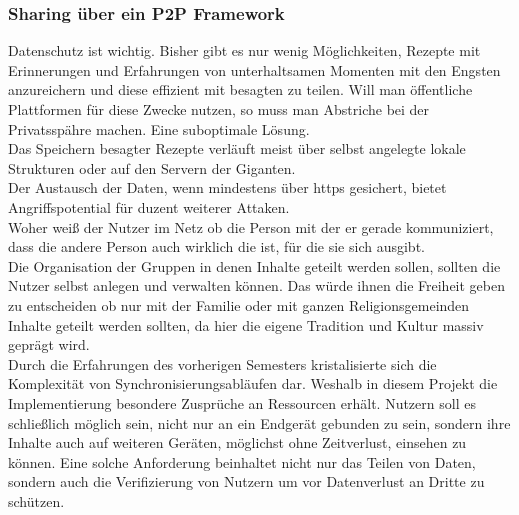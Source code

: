 \documentclass[10pt]{article}
\begin{document}
            \subsubsection{Sharing über ein P2P Framework}\label{sec:sharingframework}
            Datenschutz ist wichtig. Bisher gibt es nur wenig Möglichkeiten, Rezepte mit Erinnerungen und Erfahrungen von unterhaltsamen Momenten mit den Engsten anzureichern und diese effizient mit besagten zu teilen. Will man öffentliche Plattformen für diese Zwecke nutzen, so muss man Abstriche bei der Privatsspähre machen. Eine suboptimale Lösung.\cite{weberprivat2021}\\
            Das Speichern besagter Rezepte verläuft meist über selbst angelegte lokale Strukturen oder auf den Servern der Giganten.\cite{tissleraws2021} \\
            Der Austausch der Daten, wenn mindestens über https gesichert, bietet Angriffspotential für duzent weiterer Attaken.\cite{lindauerhttps2021}\\
            Woher weiß der Nutzer im Netz ob die Person mit der er gerade kommuniziert, dass die andere Person auch wirklich die ist, für die sie sich ausgibt.\cite{wbveepcd2021} \\
            Die Organisation der Gruppen in denen Inhalte geteilt werden sollen, sollten die Nutzer selbst anlegen und verwalten können. Das würde ihnen die Freiheit geben zu entscheiden ob nur mit der Familie oder mit ganzen Religionsgemeinden Inhalte geteilt werden sollten, da hier die eigene Tradition und Kultur massiv geprägt wird. \\
            Durch die Erfahrungen des vorherigen Semesters kristalisierte sich die Komplexität von Synchronisierungsabläufen dar. Weshalb in diesem Projekt die Implementierung besondere Zusprüche an Ressourcen erhält. Nutzern soll es schließlich möglich sein, nicht nur an ein Endgerät gebunden zu sein, sondern ihre Inhalte auch auf weiteren Geräten, möglichst ohne Zeitverlust, einsehen zu können. Eine solche Anforderung beinhaltet nicht nur das Teilen von Daten, sondern auch die Verifizierung von Nutzern um vor Datenverlust an Dritte zu schützen.
\end{document}
